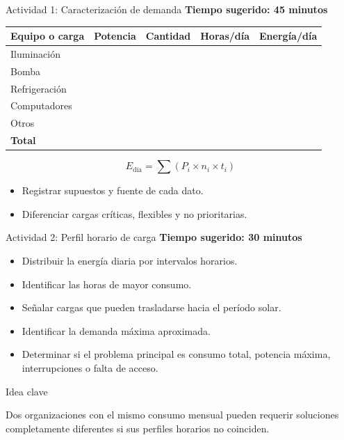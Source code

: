 \documentclass[aspectratio=169,10pt]{beamer}
\newcommand{\idea}[1]{
\begin{block}{Idea clave}
#1
\end{block}
}
\begin{document}
\begin{frame}{Actividad 1: Caracterización de demanda}
\textbf{Tiempo sugerido: 45 minutos}

\begin{table}
\centering
\small
\begin{tabular}{p{} p{} p{} p{} p{}}
\toprule
\textbf{Equipo o carga} & \textbf{Potencia} & \textbf{Cantidad} & \textbf{Horas/día} & \textbf{Energía/día} \\
\midrule
Iluminación & & & & \\
Bomba & & & & \\
Refrigeración & & & & \\
Computadores & & & & \\
Otros & & & & \\
\midrule
\textbf{Total} & & & & \\
\bottomrule
\end{tabular}
\end{table}

\vspace{0.3cm}

\[
E_{\text{día}} = \sum (P_i \times n_i \times t_i)
\]

\begin{itemize}
    \item Registrar supuestos y fuente de cada dato.
    \item Diferenciar cargas críticas, flexibles y no prioritarias.
\end{itemize}
\end{frame}

\begin{frame}{Actividad 2: Perfil horario de carga}
\textbf{Tiempo sugerido: 30 minutos}

\begin{itemize}
    \item Distribuir la energía diaria por intervalos horarios.
    \item Identificar las horas de mayor consumo.
    \item Señalar cargas que pueden trasladarse hacia el período solar.
    \item Identificar la demanda máxima aproximada.
    \item Determinar si el problema principal es consumo total, potencia máxima, interrupciones o falta de acceso.
\end{itemize}

\vspace{0.3cm}

\idea{
Dos organizaciones con el mismo consumo mensual pueden requerir soluciones completamente diferentes si sus perfiles horarios no coinciden.
}
\end{frame}
\end{document}
